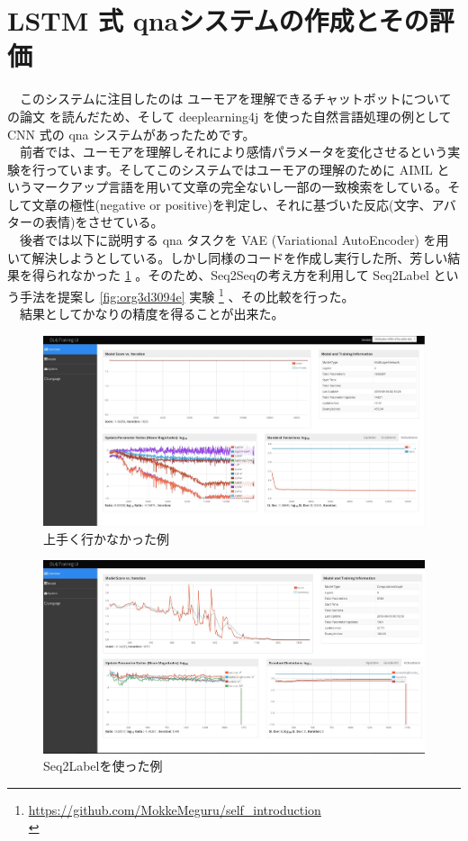 \documentclass{scrartcl}
\begin{document}
\section{LSTM 式 qnaシステムの作成とその評価}
\label{sec:orgbd72a56}
　このシステムに注目したのは ユーモアを理解できるチャットボットについての論文 \cite{humaristbot} を読んだため、そして deeplearning4j を使った自然言語処理の例として CNN 式の qna システムがあったためです。\\
　前者では、ユーモアを理解しそれにより感情パラメータを変化させるという実験を行っています。そしてこのシステムではユーモアの理解のために AIML というマークアップ言語を用いて文章の完全ないし一部の一致検索をしている。そして文章の極性(negative or positive)を判定し、それに基づいた反応(文字、アバターの表情)をさせている。\\
　後者では以下に説明する qna タスクを VAE (Variational AutoEncoder) を用いて解決しようとしている。しかし同様のコードを作成し実行した所、芳しい結果を得られなかった \ref{fig:org25df6f9} 。そのため、Seq2Seqの考え方を利用して Seq2Label という手法を提案し \ref{fig:org3d3094e} 実験 \footnote{\url{https://github.com/MokkeMeguru/self\_introduction}\\} 、その比較を行った。\\
　結果としてかなりの精度を得ることが出来た。\\

\begin{figure}[htbp]
\centering
\includegraphics[width=12cm]{./failed_qna.jpg}
\caption{\label{fig:org25df6f9}
上手く行かなかった例}
\end{figure}

\begin{figure}[htbp]
\centering
\includegraphics[width=12cm]{./success_qna.jpg}
\caption{\label{fig:orge69aa1b}
Seq2Labelを使った例}
\end{figure}
\end{document}
